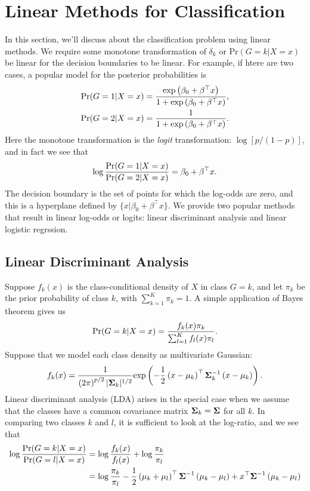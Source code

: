 \documentclass{article}
\begin{document}
\section{Linear Methods for Classification}
In this section, we'll discuss about the classification problem using linear methods.  We require some monotone transformation of $\delta_k$ or $\text{Pr}(G = k | X = x)$ be linear for the decision boundaries to be linear. For example, if htere are two cases, a popular model for the posterior probabilities is
\begin{equation}
  \begin{split}
    \text{Pr}(G = 1 | X = x) &= \frac{\text{exp}\left( \beta_0 + \beta^\top x \right)}{ 1 + \text{exp}\left( \beta_0 + \beta^\top x \right)}, \\
    \text{Pr}(G = 2 | X = x) &= \frac{1}{1 + \text{exp}\left( \beta_0 + \beta^\top x \right)}.
  \end{split}
\end{equation}
Here the monotone transformation is the \textit{logit} transformation: $\log [p/(1-p)]$, and in fact we see that
\begin{equation}
  \log \frac{\text{Pr}(G = 1 | X = x)}{\text{Pr}(G = 2 | X = x)} = \beta_0 + \beta^\top x.
\end{equation}
The decision boundary is the set of points for which the log-odds are zero, and this is a hyperplane defined by $\{x | \beta_0 + \beta^\top x\}$. We provide two popular methods that result in linear log-odds or logits: linear discriminant analysis and linear logistic regrssion.

\subsection{Linear Discriminant Analysis}
Suppose $f_k(x)$ is the class-conditional density of $X$ in class $G = k$, and let $\pi_k$ be the prior probability of class $k$, with $\sum_{k=1}^{K}\pi_k = 1$. A simple application of Bayes theorem gives us
\begin{equation}
  \text{Pr}(G = k | X = x) = \frac{f_k(x)\pi_k}{\sum_{l=1}^{K}f_l(x) \pi_l}.
\end{equation}
Suppose that we model each class density as multivariate Gaussian:
\begin{equation}
  \label{eq:multivariate_gaussian}
  f_k(x) = \frac{1}{\left( 2\pi \right)^{p/2}|\hbox{\boldmath$\Sigma$}_k|^{1/2}}\text{exp}\left( -\frac{1}{2}\left( x - \mu_k \right)^\top \hbox{\boldmath$\Sigma$}_k^{-1} \left( x - \mu_k \right) \right).
\end{equation}
Linear discriminant analysis (LDA) arises in the special case when we assume that the classes have a common covariance matrix $\hbox{\boldmath$\Sigma$}_k = \hbox{\boldmath$\Sigma$}$ for all $k$. In comparing two classes $k$ and $l$, it is sufficient to look at the log-ratio, and we see that
\begin{equation}
  \begin{split}
    \log \frac{\text{Pr}(G = k | X = x)}{\text{Pr}(G = l | X = x)} &= \log \frac{f_k(x)}{f_l(x)} + \log \frac{\pi_k}{\pi_l} \\
    &= \log \frac{\pi_k}{\pi_l} - \frac{1}{2} \left( \mu_k + \mu_l \right)^\top \hbox{\boldmath$\Sigma$}^{-1} \left( \mu_k - \mu_l \right) + x^\top \hbox{\boldmath$\Sigma$}^{-1} \left( \mu_k - \mu_l \right)
  \end{split}
\end{equation}
\end{document}
